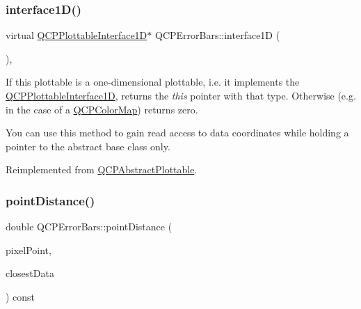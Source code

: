\subsubsection{\texorpdfstring{interface1D()}{interface1D()}}
{\footnotesize\ttfamily virtual \mbox{\hyperlink{class_q_c_p_plottable_interface1_d}{Q\+C\+P\+Plottable\+Interface1D}}$\ast$ Q\+C\+P\+Error\+Bars\+::interface1D (\begin{DoxyParamCaption}{ }\end{DoxyParamCaption})\hspace{0.3cm}{\ttfamily [inline]}, {\ttfamily [virtual]}}

If this plottable is a one-\/dimensional plottable, i.\+e. it implements the \mbox{\hyperlink{class_q_c_p_plottable_interface1_d}{Q\+C\+P\+Plottable\+Interface1D}}, returns the {\itshape this} pointer with that type. Otherwise (e.\+g. in the case of a \mbox{\hyperlink{class_q_c_p_color_map}{Q\+C\+P\+Color\+Map}}) returns zero.

You can use this method to gain read access to data coordinates while holding a pointer to the abstract base class only. 

Reimplemented from \mbox{\hyperlink{class_q_c_p_abstract_plottable_a81fd9fd5c4f429c074785e2eb238a8e7}{Q\+C\+P\+Abstract\+Plottable}}.

\mbox{\label{class_q_c_p_error_bars_a8e904076bad643f43af28b95f21c1b88}} 
\subsubsection{\texorpdfstring{pointDistance()}{pointDistance()}}
{\footnotesize\ttfamily double Q\+C\+P\+Error\+Bars\+::point\+Distance (\begin{DoxyParamCaption}\item[{const Q\+PointF \&}]{pixel\+Point,  }\item[{Q\+C\+P\+Error\+Bars\+Data\+Container\+::const\+\_\+iterator \&}]{closest\+Data }\end{DoxyParamCaption}) const\hspace{0.3cm}{\ttfamily [protected]}}

\mbox{\label{class_q_c_p_error_bars_aa9b1642567a0aff8a2f6e0556c563633}} 
